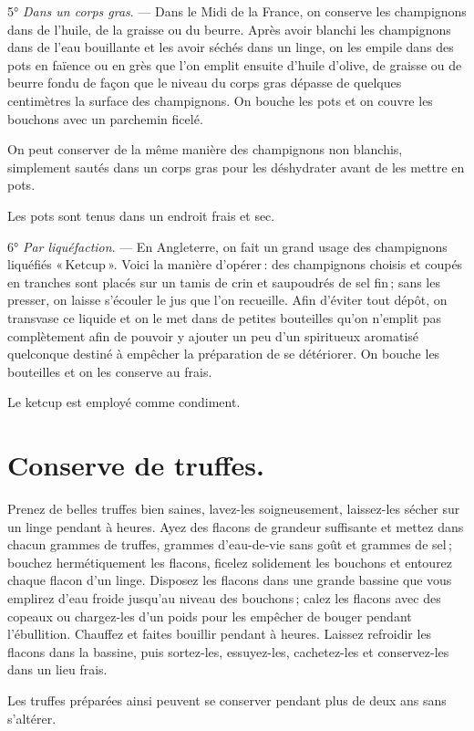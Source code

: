\medskip

5° \textit{Dans un corps gras}. — Dans le Midi de la France, on conserve les
champignons dans de l'huile, de la graisse ou du beurre. Après avoir blanchi
les champignons dans de l’eau bouillante et les avoir séchés dans un linge, on
les empile dans des pots en faïence ou en grès que l'on emplit ensuite d'huile
d'olive, de graisse ou de beurre fondu de façon que le niveau du corps gras
dépasse de quelques centimètres la surface des champignons. On bouche les pots
et on couvre les bouchons avec un parchemin ficelé.

On peut conserver de la même manière des champignons non blanchis, simplement
sautés dans un corps gras pour les déshydrater avant de les mettre en pots.

Les pots sont tenus dans un endroit frais et sec.

\smallskip

6° \textit{Par liquéfaction}. — En Angleterre, on fait un grand usage des
champignons liquéfiés « Ketcup ». Voici la manière d'opérer : des champignons
choisis et coupés en tranches sont placés sur un tamis de crin et saupoudrés de
sel fin ; sans les presser, on laisse s'écouler le jus que l'on recueille. Afin
d'éviter tout dépôt, on transvase ce liquide et on le met dans de petites
bouteilles qu'on n'emplit pas complètement afin de pouvoir y ajouter un peu
d'un spiritueux aromatisé quelconque destiné à empêcher la préparation de se
détériorer. On bouche les bouteilles et on les conserve au frais.

Le ketcup est employé comme condiment.

\section*{\centering Conserve de truffes.}
{}

Prenez de belles truffes bien saines, lavez-les soigneusement, laissez-les
sécher sur un linge pendant {\mmm} à {\mmm} heures. Ayez des flacons
de grandeur suffisante et mettez dans chacun {\mmm} grammes de truffes,
{\mmm} grammes d'eau-de-vie sans goût et {\mmm} grammes de sel ;
bouchez hermétiquement les flacons, ficelez solidement les bouchons et entourez
chaque flacon d'un linge. Disposez les flacons dans une grande bassine que vous
emplirez d'eau froide jusqu'au niveau des bouchons ; calez les flacons avec des
copeaux ou chargez-les d'un poids pour les empêcher de bouger pendant
l'ébullition. Chauffez et faites bouillir pendant {\mmm} à {\mmm}
heures. Laissez refroidir les flacons dans la bassine, puis sortez-les,
essuyez-les, cachetez-les et conservez-les dans un lieu frais.

Les truffes préparées ainsi peuvent se conserver pendant plus de deux ans sans
s'altérer.
